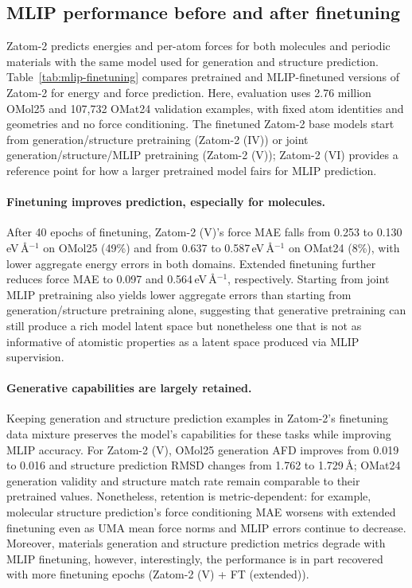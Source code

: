 \documentclass{article} %
\begin{document}
\subsection{MLIP performance before and after finetuning}
\label{sec:results-mlip-finetuning}

Zatom-2 predicts energies and per-atom forces for both molecules and periodic materials with the same model used for generation and structure prediction. Table~\ref{tab:mlip-finetuning} compares pretrained and MLIP-finetuned versions of Zatom-2 for energy and force prediction. Here, evaluation uses 2.76 million OMol25 and 107,732 OMat24 validation examples, with fixed atom identities and geometries and no force conditioning. The finetuned Zatom-2 base models start from generation/structure pretraining (Zatom-2 (IV)) or joint generation/structure/MLIP pretraining (Zatom-2 (V)); Zatom-2 (VI) provides a reference point for how a larger pretrained model fairs for MLIP prediction.

\paragraph{Finetuning improves prediction, especially for molecules.} After 40 epochs of finetuning, Zatom-2 (V)'s force MAE falls from 0.253 to 0.130\,eV\,\AA$^{-1}$ on OMol25 (49\%) and from 0.637 to 0.587\,eV\,\AA$^{-1}$ on OMat24 (8\%), with lower aggregate energy errors in both domains. Extended finetuning further reduces force MAE to 0.097 and 0.564\,eV\,\AA$^{-1}$, respectively. Starting from joint MLIP pretraining also yields lower aggregate errors than starting from generation/structure pretraining alone, suggesting that generative pretraining can still produce a rich model latent space but nonetheless one that is not as informative of atomistic properties as a latent space produced via MLIP supervision.

\paragraph{Generative capabilities are largely retained.}
Keeping generation and structure prediction examples in Zatom-2's finetuning data mixture preserves the model's capabilities for these tasks while improving MLIP accuracy. For Zatom-2 (V), OMol25 generation AFD improves from 0.019 to 0.016 and structure prediction RMSD changes from 1.762 to 1.729\,\AA; OMat24 generation validity and structure match rate remain comparable to their pretrained values. Nonetheless, retention is metric-dependent: for example, molecular structure prediction's force conditioning MAE worsens with extended finetuning even as UMA mean force norms and MLIP errors continue to decrease. Moreover, materials generation and structure prediction metrics degrade with MLIP finetuning, however, interestingly, the performance is in part recovered with more finetuning epochs (Zatom-2 (V) + FT (extended)).
\end{document}
